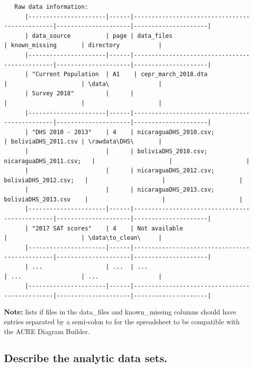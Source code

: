 \documentclass[]{book}
\begin{document}
\begin{verbatim}
   Raw data information:
      |----------------------|------|-----------------------------------------------|---------------------|---------------------|
      | data_source          | page | data_files                                    | known_missing       | directory           |
      |----------------------|------|-----------------------------------------------|---------------------|---------------------|
      | "Current Population  | A1    | cepr_march_2018.dta                          |                     | \data\              |
      | Survey 2018"         |      |                                               |                     |                     |
      |----------------------|------|-----------------------------------------------|---------------------|---------------------|
      | "DHS 2010 - 2013"    | 4    | nicaraguaDHS_2010.csv;                        | boliviaDHS_2011.csv | \rawdata\DHS\       |
      |                      |      | boliviaDHS_2010.csv; nicaraguaDHS_2011.csv;   |                     |                     |
      |                      |      | nicaraguaDHS_2012.csv; boliviaDHS_2012.csv;   |                     |                     |
      |                      |      | nicaraguaDHS_2013.csv; boliviaDHS_2013.csv    |                     |                     |
      |----------------------|------|-----------------------------------------------|---------------------|---------------------|
      | "2017 SAT scores"    | 4    | Not available                                 |                     | \data\to_clean\     |
      |----------------------|------|-----------------------------------------------|---------------------|---------------------|
      | ...                  | ...  | ...                                           | ...                 | ...                 |
      |----------------------|------|-----------------------------------------------|---------------------|---------------------|
\end{verbatim}

\textbf{Note:} lists if files in the data\_files and known\_missing columns should have entries separated by a semi-colon to for the spreadsheet to be compatible with the ACRE Diagram Builder.

\hypertarget{desc-analy}{%
\subsection{Describe the analytic data sets.}\label{desc-analy}}
\end{document}
